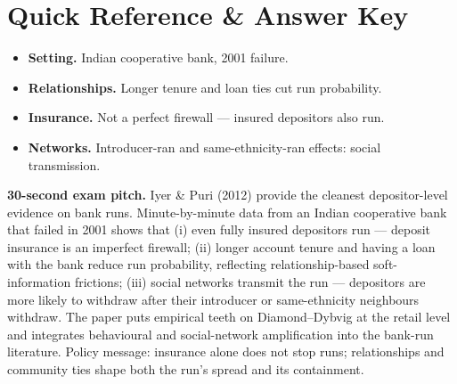 \documentclass[11pt]{article}
\begin{document}
\section*{Quick Reference \& Answer Key}
\begin{answerbox}
\begin{itemize}
\item \textbf{Setting.} Indian cooperative bank, 2001 failure.
\item \textbf{Relationships.} Longer tenure and loan ties cut run probability.
\item \textbf{Insurance.} Not a perfect firewall --- insured depositors also run.
\item \textbf{Networks.} Introducer-ran and same-ethnicity-ran effects: social transmission.
\end{itemize}
\end{answerbox}

\begin{keybox}
\textbf{30-second exam pitch.} Iyer \& Puri (2012) provide the cleanest depositor-level evidence on bank runs. Minute-by-minute data from an Indian cooperative bank that failed in 2001 shows that (i) even fully insured depositors run --- deposit insurance is an imperfect firewall; (ii) longer account tenure and having a loan with the bank reduce run probability, reflecting relationship-based soft-information frictions; (iii) social networks transmit the run --- depositors are more likely to withdraw after their introducer or same-ethnicity neighbours withdraw. The paper puts empirical teeth on Diamond--Dybvig at the retail level and integrates behavioural and social-network amplification into the bank-run literature. Policy message: insurance alone does not stop runs; relationships and community ties shape both the run's spread and its containment.
\end{keybox}
\end{document}

